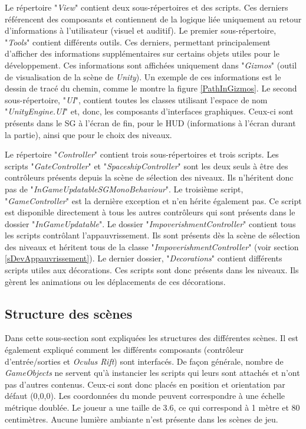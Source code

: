 		Le répertoire "\textit{View}" contient deux sous-répertoires et des scripts. Ces derniers référencent des composants et contiennent de la logique liée uniquement au retour d'informations à l'utilisateur (visuel et auditif). Le premier sous-répertoire, "\textit{Tools}" contient différents outils. Ces derniers, permettant principalement d'afficher des informations supplémentaires sur certains objets utiles pour le développement. Ces informations sont affichées uniquement dans "\textit{Gizmos}" (outil de visualisation de la scène de \textit{Unity}). Un exemple de ces informations est le dessin de tracé du chemin, comme le montre la figure \ref{PathInGizmos}. Le second sous-répertoire, "\textit{UI}", contient toutes les classes utilisant l'espace de nom "\textit{UnityEngine.UI}" et, donc, les composants d'interfaces graphiques. Ceux-ci sont présents dans le SG à l'écran de fin, pour le HUD (informations à l'écran durant la partie), ainsi que pour le choix des niveaux.
		
		Le répertoire "\textit{Controller}" contient trois sous-répertoires et trois scripts. Les scripts "\textit{GateController}" et "\textit{SpaceshipController}" sont les deux seuls à être des contrôleurs présents depuis la scène de sélection des niveaux. Ils n'héritent donc pas de "\textit{InGameUpdatableSGMonoBehaviour}". Le troisième script, "\textit{GameController}" est la dernière exception et n'en hérite également pas. Ce script est disponible directement à tous les autres contrôleurs qui sont présents dans le dossier "\textit{InGameUpdatable}". Le dossier "\textit{ImpoverishmentController}" contient tous les scripts contrôlant l'appauvrissement. Ils sont présents dès la scène de sélection des niveaux et héritent tous de la classe "\textit{ImpoverishmentController}" (voir section \ref{sDevAppauvrissement}). Le dernier dossier, "\textit{Decorations}" contient différents scripts utiles aux décorations. Ces scripts sont donc présents dans les niveaux. Ils gèrent les animations ou les déplacements de ces décorations.
		
	\subsection*{Structure des scènes}
		Dans cette sous-section sont expliquées les structures des différentes scènes. Il est également expliqué comment les différents composants (contrôleur d'entrée/sorties et \textit{Oculus Rift}) sont interfacés. De façon générale, nombre de \textit{GameObjects} ne servent qu'à instancier les scripts qui leurs sont attachés et n'ont pas d'autres contenus. Ceux-ci sont donc placés en position et orientation par défaut (0,0,0). Les coordonnées du monde peuvent correspondre à une échelle métrique doublée. Le joueur a une taille de 3.6, ce qui correspond à 1 mètre et 80 centimètres. %
		Aucune lumière ambiante n'est présente dans les scènes de jeu.
		
